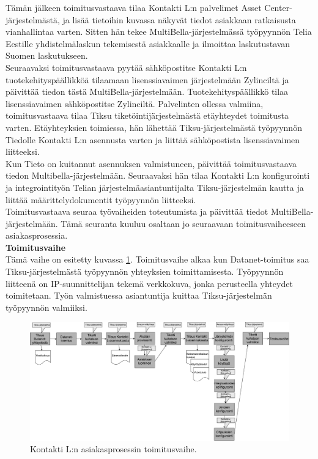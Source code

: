 \documentclass[finnish,12pt,a4paper,pdftex]{article}
\begin{document}
\noindent Tämän jälkeen toimitusvastaava tilaa Kontakti L:n palvelimet Asset Center-järjestelmästä, ja lisää tietoihin kuvassa näkyvät tiedot asiakkaan ratkaisusta vianhallintaa varten. Sitten hän tekee MultiBella-järjestelmässä työpyynnön Telia Eestille yhdistelmälaskun tekemisestä asiakkaalle ja ilmoittaa laskutustavan Suomen laskutukseen.\\

\noindent Seuraavaksi toimitusvastaava pyytää sähköpostitse Kontakti L:n tuotekehityspäällikköä tilaamaan lisenssiavaimen järjestelmään Zylinciltä ja päivittää tiedon tästä MultiBella-järjestelmään. Tuotekehityspäällikkö tilaa lisenssiavaimen sähköpostitse Zylinciltä. Palvelinten ollessa valmiina, toimitusvastaava tilaa Tiksu tiketöintijärjestelmästä etäyhteydet toimitusta varten. Etäyhteyksien toimiessa, hän lähettää Tiksu-järjestelmästä työpyynnön Tiedolle Kontakti L:n asennusta varten ja liittää sähköpostista lisenssiavaimen liitteeksi.\\

\noindent Kun Tieto on kuitannut asennuksen valmistuneen, päivittää toimitusvastaava tiedon Multibella-järjestelmään. Seuraavaksi hän tilaa Kontakti L:n konfigurointi ja integrointityön Telian järjestelmäasiantuntijalta Tiksu-järjestelmän kautta ja liittää määrittelydokumentit työpyynnön liitteeksi.\\

\noindent Toimitusvastaava seuraa työvaiheiden toteutumista ja päivittää tiedot MultiBella-järjestelmään. Tämä seuranta kuuluu osaltaan jo seuraavaan toimitusvaiheeseen asiakasprosessia.\\

\textbf{Toimitusvaihe}\\


\noindent Tämä vaihe on esitetty kuvassa \ref{fig:toimitus}. Toimitusvaihe alkaa kun Datanet-toimitus saa Tiksu-järjestelmästä työpyynnön yhteyksien toimittamisesta. Työpyynnön liitteenä on IP-suunnittelijan tekemä verkkokuva, jonka perusteella yhteydet toimitetaan. Työn valmistuessa asiantuntija kuittaa Tiksu-järjestelmän työpyynnön valmiiksi.\\

\begin{figure}[!h]
    \centering
    \includegraphics[scale=0.3]{images/toimitus.pdf}
    \caption{Kontakti L:n asiakasprosessin toimitusvaihe.}
    \label{fig:toimitus}
\end{figure}
\end{document}
